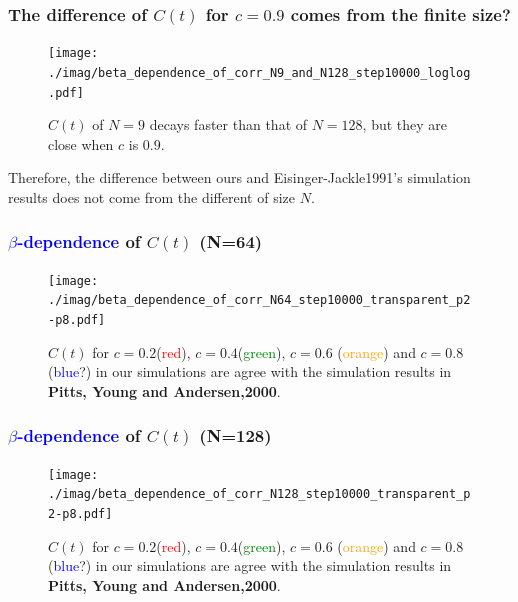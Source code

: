 \documentclass[8pt]{beamer}
\begin{document}
\begin{frame}
	\frametitle{The difference of $C(t)$ for $c=0.9$ comes from the finite size?}
	\begin{figure}
		\centering
		\texttt{[image: ./imag/beta\_dependence\_of\_corr\_N9\_and\_N128\_step10000\_loglog.pdf]}
		\setlength{\abovecaptionskip}{0pt}
		\caption{$C(t)$ of $N=9$ decays faster than that of $N=128$, but they are close when $c$ is $0.9$. }
	\end{figure}
Therefore, the difference between ours and Eisinger-Jackle1991's simulation results does not come from the different of size $N$.
\end{frame}


\begin{frame}
	\frametitle{{\textcolor{blue}{$\beta$-dependence}} of $C(t)$ (N=64)}
	\begin{figure}
		\centering
		\texttt{[image: ./imag/beta\_dependence\_of\_corr\_N64\_step10000\_transparent\_p2-p8.pdf]}
		\setlength{\abovecaptionskip}{0pt}
		\caption{$C(t)$ for $c=0.2$({\textcolor{red}{red}}), $c=0.4$({\textcolor{green}{green}}), $c=0.6$ ({\textcolor{orange}{orange}}) and $c=0.8$ ({\textcolor{blue}{blue}}?)  in our simulations  are agree with the simulation results in \textbf{Pitts, Young and Andersen,2000}.}
	\end{figure}
\end{frame}

\begin{frame}
	\frametitle{{\textcolor{blue}{$\beta$-dependence}} of $C(t)$ (N=128)}
	\begin{figure}
		\centering
		\texttt{[image: ./imag/beta\_dependence\_of\_corr\_N128\_step10000\_transparent\_p2-p8.pdf]}
		\setlength{\abovecaptionskip}{0pt}
		\caption{$C(t)$ for $c=0.2$({\textcolor{red}{red}}), $c=0.4$({\textcolor{green}{green}}), $c=0.6$ ({\textcolor{orange}{orange}}) and $c=0.8$ ({\textcolor{blue}{blue}?})  in our simulations  are agree with the simulation results in \textbf{Pitts, Young and Andersen,2000}.}
	\end{figure}
\end{frame}
\end{document}

